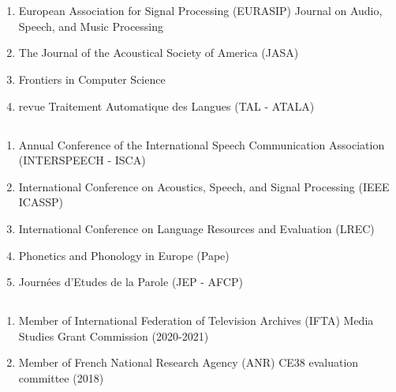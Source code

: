 \section{\EvalSec}
\subsection{\EvalJournal}
\begin{enumerate}[nosep, after=\strut, leftmargin=1em, itemsep=3pt]
\item European Association for Signal Processing (EURASIP) Journal on Audio, Speech, and Music Processing
\item The Journal of the Acoustical Society of America (JASA)
\item Frontiers in Computer Science
\item revue Traitement Automatique des Langues (TAL - ATALA)
\end{enumerate}
\subsection{\EvalConf}
\begin{enumerate}[nosep,after=\strut, leftmargin=1em, itemsep=3pt]
\item Annual Conference of the International Speech Communication Association (INTERSPEECH - ISCA)
\item International Conference on Acoustics, Speech, and Signal Processing (IEEE ICASSP)
\item International Conference on Language Resources and Evaluation (LREC)
\item Phonetics and Phonology in Europe (Pape)
\item Journées d’Etudes de la Parole (JEP - AFCP)
\end{enumerate}
\subsection{\EvalProj}

\begin{en}
\begin{enumerate}[nosep,after=\strut, leftmargin=1em, itemsep=3pt]
\item Member of International Federation of Television Archives (IFTA) Media Studies Grant Commission (2020-2021)
\item Member of French National Research Agency (ANR) CE38 evaluation committee (2018)
\end{enumerate}
\end{en}

